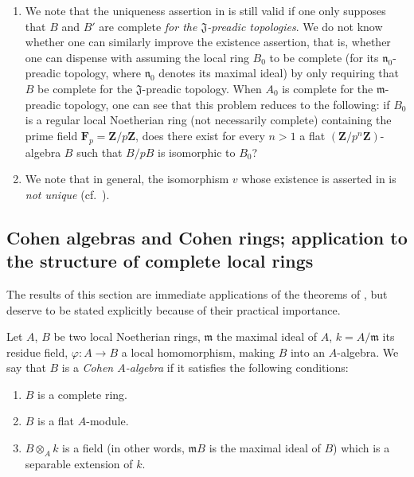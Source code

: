 \begin{remarks}[19.7.3]
\label{0.19.7.3}
\begin{enumerate}
  \item[\rm(i)] We note that the uniqueness assertion in  is still valid if one only supposes that $B$ and $B'$ are complete \emph{for the $\mathfrak{J}$-preadic topologies}.
We do not know whether one can similarly improve the existence assertion, that is, whether one can dispense with assuming the local ring $B_0$ to be complete (for its $\mathfrak{n}_0$-preadic topology, where $\mathfrak{n}_0$ denotes its maximal ideal) by only requiring that $B$ be complete for the $\mathfrak{J}$-preadic topology.
When $A_0$ is complete for the $\mathfrak{m}$-preadic topology, one can see that this problem reduces to the following: if $B_0$ is a regular local Noetherian ring (not necessarily complete) containing the prime field $\mathbf{F}_p=\mathbf{Z}/p\mathbf{Z}$, does there exist for every $n>1$ a flat $(\mathbf{Z}/p^n\mathbf{Z})$-algebra $B$ such that $B/pB$ is isomorphic to $B_0$?
  \item[\rm(ii)] We note that in general, the isomorphism $v$ whose existence is asserted in  is \emph{not unique} (cf.\ ).
\end{enumerate}
\end{remarks}

\subsection{Cohen algebras and Cohen rings; application to the structure of complete local rings}
\label{subsection:0.19.8}
\label{0.19.8}

The results of this section are immediate applications of the theorems of , but deserve to be stated explicitly because of their practical importance.

\begin{definition}[19.8.1]
\label{0.19.8.1}
Let $A$, $B$ be two local Noetherian rings, $\mathfrak{m}$ the maximal ideal of $A$, $k=A/\mathfrak{m}$ its residue field, $\varphi:A\to B$ a local homomorphism, making $B$ into an $A$-algebra.
We say that $B$ is a \emph{Cohen $A$-algebra} if it satisfies the following conditions:
\begin{enumerate}
  \item[\rm(i)] $B$ is a complete ring.
  \item[\rm(ii)] $B$ is a flat $A$-module.
  \item[\rm(iii)] $B\otimes_A k$ is a field (in other words, $\mathfrak{m}B$ is the maximal ideal of $B$) which is a separable extension of $k$.
\end{enumerate}
\end{definition}

